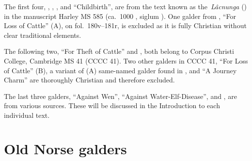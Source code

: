 The first four, , , , and “Childbirth”, are from the text known as the \emph{Lâcnunga} (\Lacnunga) in the manuscript Harley MS 585 (ca.~1000 \ce, siglum \LacnungaMS).  One galder from \Lacnunga, “For Loss of Cattle” (A), on fol.~180v--181r, is excluded as it is fully Christian without clear traditional elements.

The following two, “For Theft of Cattle” and , both belong to Corpus Christi College, Cambridge MS 41 (CCCC 41).  Two other galders in CCCC 41, “For Loss of Cattle” (B), a variant of (A) same-named galder found in \Lacnunga, and “A Journey Charm” are thoroughly Christian and therefore excluded.

The last three galders, “Against Wen”, “Against Water-Elf-Disease”, and , are from various sources.  These will be discussed in the Introduction to each individual text.

\newpage


\newpage

\newpage

\newpage

\newpage

\newpage

\newpage

\newpage

\newpage



\chapter{Old Norse galders}


\newpage

\newpage

\newpage

\newpage

\newpage

\newpage



